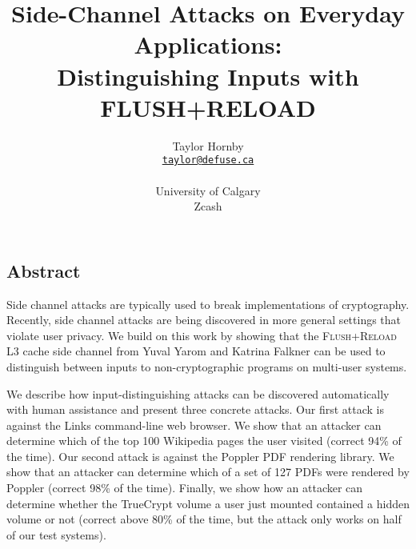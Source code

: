 \documentclass[letterpaper,twocolumn,10pt]{article}
\begin{document}
\date{}

\title{\Large \bf Side-Channel Attacks on Everyday Applications: \\
Distinguishing Inputs with FLUSH+RELOAD}

\author{
{\rm Taylor Hornby}\\
\rm \href{mailto:taylor@defuse.ca}{\texttt{taylor@defuse.ca}}\\
\\
University of Calgary\\
Zcash
} %

\maketitle



\subsection*{Abstract}
Side channel attacks are typically used to break implementations of
cryptography. Recently, side channel attacks are being discovered in more
general settings that violate user privacy. We build on this work by showing
that the \textsc{Flush+Reload} L3 cache side channel from Yuval Yarom and
Katrina Falkner \cite{yarom2013flush} can be used to distinguish between inputs
to non-cryptographic programs on multi-user systems. 

We describe how input-distinguishing attacks can be discovered automatically
with human assistance and present three concrete attacks. Our first attack is
against the Links command-line web browser. We show that an attacker can
determine which of the top 100 Wikipedia pages the user visited (correct 94\% of
the time). Our second attack is against the Poppler PDF rendering library. We
show that an attacker can determine which of a set of 127 PDFs were rendered by
Poppler (correct 98\% of the time). Finally, we show how an attacker can
determine whether the TrueCrypt volume a user just mounted contained a hidden
volume or not (correct above 80\% of the time, but the attack only works on half
of our test systems). 
\end{document}
